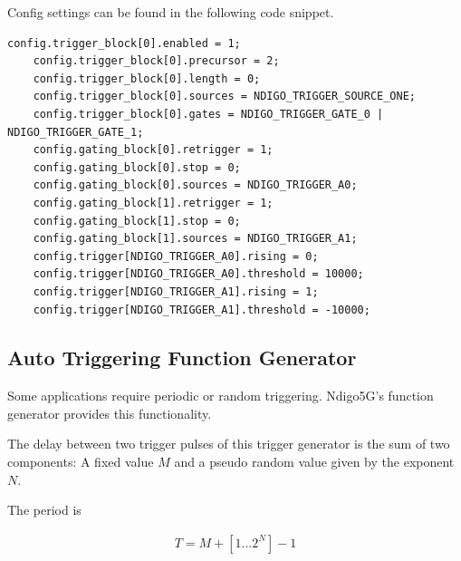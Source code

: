             Config settings can be found in the following code snippet.

\begin{lstlisting}[frame=tlrb]
    config.trigger_block[0].enabled = 1;
    config.trigger_block[0].precursor = 2;
    config.trigger_block[0].length = 0;
    config.trigger_block[0].sources = NDIGO_TRIGGER_SOURCE_ONE;
    config.trigger_block[0].gates = NDIGO_TRIGGER_GATE_0 | NDIGO_TRIGGER_GATE_1;
    config.gating_block[0].retrigger = 1;
    config.gating_block[0].stop = 0;
    config.gating_block[0].sources = NDIGO_TRIGGER_A0;
    config.gating_block[1].retrigger = 1;
    config.gating_block[1].stop = 0;
    config.gating_block[1].sources = NDIGO_TRIGGER_A1;
    config.trigger[NDIGO_TRIGGER_A0].rising = 0;
    config.trigger[NDIGO_TRIGGER_A0].threshold = 10000;
    config.trigger[NDIGO_TRIGGER_A1].rising = 1;
    config.trigger[NDIGO_TRIGGER_A1].threshold = -10000;
\end{lstlisting}

    \subsection{Auto Triggering Function Generator\label{cp:AutoTriggeringFunctionGenerator}}

        Some applications require periodic or random triggering. Ndigo5G's function generator provides this functionality.\par

        The delay between two trigger pulses of this trigger generator is the sum of two components: A fixed value $M$ and a pseudo random value given by the exponent $N$. \par

        The period is

        \begin{align}
            T = M + [1...2^N] - 1
        \end{align}

